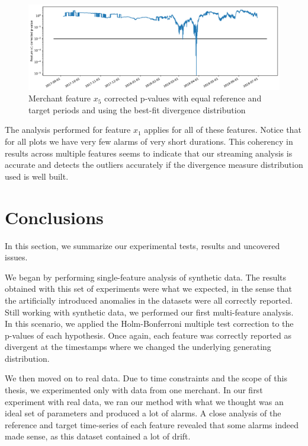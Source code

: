 \begin{figure}[!htb]
    \begin{center}
      \includegraphics[scale=0.5]{figures/merchant3-x5-correctedpvalues.pdf}
      \caption{Merchant feature $x_5$ corrected p-values with equal reference and target periods and using the best-fit divergence distribution}
      \label{fig:merchant3-x5-correctedpvalues}
    \end{center}
\end{figure}
The analysis performed for feature $x_1$ applies for all of these features. Notice that for all plots we have very few alarms of very short durations. This coherency in results across multiple features seems to indicate that our streaming analysis is accurate and detects the outliers accurately if the divergence measure distribution used is well built.

\newpage
\section{Conclusions}
In this section, we summarize our experimental tests, results and uncovered issues.

We began by performing single-feature analysis of synthetic data. The results obtained with this set of experiments were what we expected, in the sense that the artificially introduced anomalies in the datasets were all correctly reported. Still working with synthetic data, we performed our first multi-feature analysis. In this scenario, we applied the Holm-Bonferroni multiple test correction to the p-values of each hypothesis. Once again, each feature was correctly reported as divergent at the timestamps where we changed the underlying generating distribution.

We then moved on to real data. Due to time constraints and the scope of this thesis, we experimented only with data from one merchant. In our first experiment with real data, we ran our method with what we thought was an ideal set of parameters and produced a lot of alarms. A close analysis of the reference and target time-series of each feature revealed that some alarms indeed made sense, as this dataset contained a lot of drift. 

